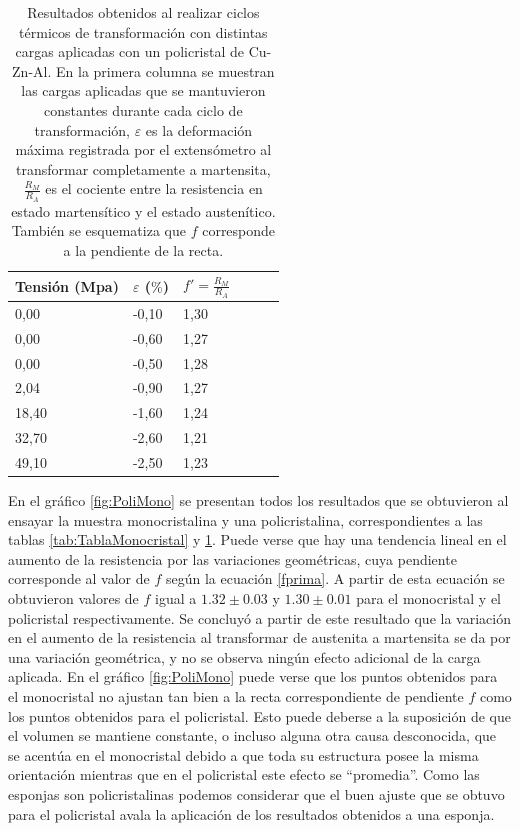 \documentclass[a4paper,12pt,fleqn,twoside,openany]{book}
\begin{document}
\begin{table} 
\begin{center} 
\begin{tabular}{@{}llllll@{}} \toprule
Tensión (Mpa) & $\varepsilon$ ($\%$) &  $f'=\frac{R_M}{R_A}$\\ \midrule
 0,00        &  -0,10   & 1,30\\
 0,00       &  -0,60   & 1,27 \\
 0,00      &  -0,50   & 1,28 \\
 2,04      &  -0,90  & 1,27\\
 18,40    &  -1,60  & 1,24 \\
32,70      &  -2,60 & 1,21\\
 49,10     &  -2,50  & 1,23   \\
 \bottomrule
\end{tabular}
\caption{Resultados obtenidos al realizar ciclos térmicos de transformación con distintas cargas aplicadas con un policristal de Cu-Zn-Al. En la primera columna se muestran las cargas aplicadas que se mantuvieron constantes durante cada ciclo de transformación, $\varepsilon$ es la deformación máxima registrada por el extensómetro al transformar completamente a martensita, $\frac{R_M}{R_A}$ es el cociente entre la resistencia en estado martensítico y el estado austenítico. También se esquematiza que $f$ corresponde a la pendiente de la recta.}
\label{tab:TablaPolicristal}
\end{center}
\end{table}

En el gráfico \ref{fig:PoliMono} se presentan todos los resultados que se obtuvieron al ensayar la muestra monocristalina y una policristalina, correspondientes a las tablas \ref{tab:TablaMonocristal} y \ref{tab:TablaPolicristal}. Puede verse que hay una tendencia lineal en el aumento de la resistencia por las variaciones geométricas, cuya pendiente corresponde al valor de $f$ según la ecuación \ref{fprima}. A partir de esta ecuación se obtuvieron valores de $f$ igual a $1.32\pm0.03$ y $1.30 \pm 0.01$ para el monocristal y el policristal respectivamente.  Se concluyó a partir de este resultado que la variación en el aumento de la resistencia al transformar de austenita a martensita se da por una variación geométrica, y no se observa ningún efecto adicional de la carga aplicada.
En el gráfico \ref{fig:PoliMono} puede verse que los puntos obtenidos para el monocristal no ajustan tan bien a la recta correspondiente de pendiente $f$ como los puntos obtenidos para el policristal. Esto puede deberse a la suposición de que el volumen se mantiene constante, o incluso alguna otra causa desconocida, que se acentúa en el monocristal debido a que toda su estructura posee la misma orientación mientras que en el policristal este efecto se ``promedia''. Como las esponjas son policristalinas podemos considerar que el buen ajuste que se obtuvo para el policristal avala la aplicación de los resultados obtenidos a una esponja.
\end{document}
